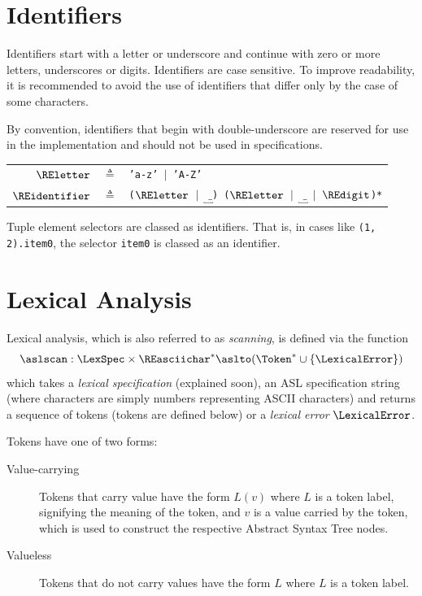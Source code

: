 \section{Identifiers}
Identifiers start with a letter or underscore and continue with zero or more letters, underscores or digits.
Identifiers are case sensitive. To improve readability, it is recommended to avoid the use of identifiers that differ
only by the case of some characters.

By convention, identifiers that begin with double-underscore are reserved for use in the implementation and should
not be used in specifications.

\hypertarget{def-reletter}{}
\hypertarget{def-reidentifier}{}
\begin{center}
\begin{tabular}{rcl}
$\REletter$ &$\triangleq$& \texttt{'a-z' $|$ 'A-Z'}\\
$\REidentifier$ &$\triangleq$& \texttt{($\REletter$ $|$ $\underbracket{\texttt{ \_ } }$) ($\REletter$ $|$ $\underbracket{\texttt{ \_ } }$ $|$ $\REdigit$)*}\\
\end{tabular}
\end{center}


Tuple element selectors are classed as identifiers. That is, in cases like \texttt{(1, 2).item0},
the selector \texttt{item0} is classed as an identifier.

\section{Lexical Analysis}
Lexical analysis, which is also referred to as \emph{scanning}, is defined via the function
\hypertarget{def-aslscan}{}
\[
\aslscan : \LexSpec \times \REasciichar^* \aslto (\Token^* \cup \{\LexicalError\})
\]
\hypertarget{def-lexicalerrorresult}{}
which takes a \emph{lexical specification} (explained soon), an ASL specification string
(where characters are simply numbers representing ASCII characters)
and returns a sequence of tokens (tokens are defined below) or a \emph{lexical error} $\LexicalError$.

Tokens have one of two forms:
\begin{description}
  \item[Value-carrying] Tokens that carry value have the form $L(v)$ where $L$ is a token label,
        signifying the meaning of the token, and $v$ is a value carried by the token,
        which is used to construct the respective Abstract Syntax Tree nodes.
  \item[Valueless] Tokens that do not carry values have the form $L$ where $L$ is a token label.
\end{description}

